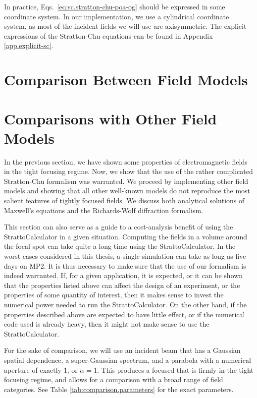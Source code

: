 \documentclass[11pt,SymmetricalJury]{inrsthesis/inrsthesis}
\begin{document}
In practice, Eqs.~\eqref{eq:sc.stratton-chu-poa-og} should be expressed in some
coordinate system. In our implementation, we use a cylindrical coordinate
system, as most of the incident fields we will use are axisymmetric. The
explicit expressions of the Stratton-Chu equations can be found in Appendix
\ref{app.explicit-sc}.

\section{Comparison Between Field Models}

\section{Comparisons with Other Field Models}

In the previous section, we have shown some properties of electromagnetic fields
in the tight focusing regime. Now, we show that the use of the rather
complicated Stratton-Chu formalism was warranted. We proceed by implementing
other field models and showing that all other well-known models do not reproduce
the most salient features of tightly focused fields. We discuss both analytical
solutions of Maxwell's equations and the Richards-Wolf diffraction formalism.

This section can also serve as a guide to a cost-analysis benefit of using the
StrattoCalculator in a given situation. Computing the fields in a volume around
the focal spot can take quite a long time using the StrattoCalculator. In the
worst cases considered in this thesis, a single simulation can take as long as
five days on MP2. It is thus necessary to make sure that the use of our
formalism is indeed warranted. If, for a given application, it is expected, or
it can be shown that the properties listed above can affect the design of an
experiment, or the properties of some quantity of interest, then it makes sense
to invest the numerical power needed to run the StrattoCalculator. On the other
hand, if the properties described above are expected to have little effect, or
if the numerical code used is already heavy, then it might not make sense to use
the StrattoCalculator.

For the sake of comparison, we will use an incident beam that has a Gaussian
spatial dependence, a super-Gaussian spectrum, and a parabola with a numerical
aperture of exactly 1, or $\alpha=1$. This produces a focused that is firmly in
the tight focusing regime, and allows for a comparison with a broad range of
field categories. See Table \ref{tab:comparison.parameters} for the exact
parameters.
\end{document}
